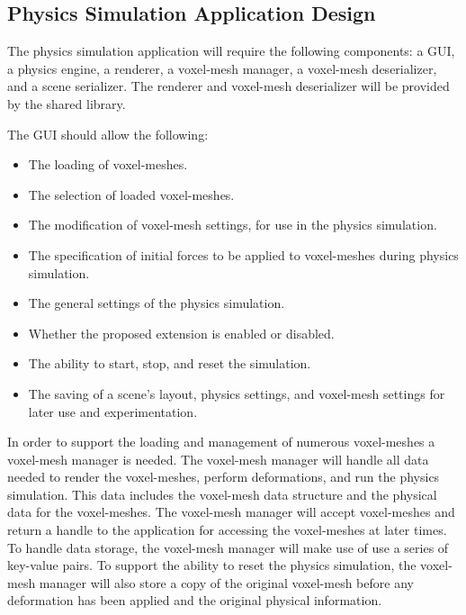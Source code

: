 

\subsection{Physics Simulation Application Design}

The physics simulation application will require the following components: a GUI, a physics 
engine, a renderer, a voxel-mesh manager, a voxel-mesh deserializer, and a scene serializer. The 
renderer and voxel-mesh deserializer will be provided by the shared library.

The GUI should allow the following:

\begin{itemize}
  \item The loading of voxel-meshes.
  \item The selection of loaded voxel-meshes.
  \item The modification of voxel-mesh settings, for use in the physics simulation.
  \item The specification of initial forces to be applied to voxel-meshes during physics simulation.
  \item The general settings of the physics simulation.
  \item Whether the proposed extension is enabled or disabled.
  \item The ability to start, stop, and reset the simulation.
  \item The saving of a scene's layout, physics settings, and voxel-mesh settings for later use and
  experimentation.
\end{itemize}

In order to support the loading and management of numerous voxel-meshes a voxel-mesh manager is 
needed. The voxel-mesh manager will handle all data needed to render the voxel-meshes, perform
deformations, and run the physics simulation. This data includes the voxel-mesh data structure and
the physical data for the voxel-meshes. The voxel-mesh manager will accept voxel-meshes and return a 
handle to the application for accessing the voxel-meshes at later times. 
To handle data storage, the voxel-mesh manager will make use of use a series of key-value pairs. To 
support the ability to reset the physics simulation, the voxel-mesh manager will also store a
copy of the original voxel-mesh before any deformation has been applied and the original physical 
information.

